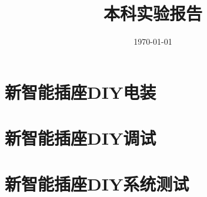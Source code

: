 \documentclass{zjureport}
\title{本科实验报告}
\date{\today}
\begin{document}
\makecover


\makeheader


\section{新智能插座DIY电装}

\section{新智能插座DIY调试}

\section{新智能插座DIY系统测试}

\end{document}
